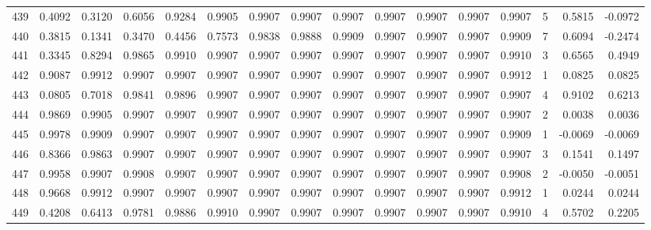 \begin{tabular}{lrrrrrrrrrrrrrrr}
439 &      0.4092 &  0.3120 &  0.6056 &  0.9284 &  0.9905 &  0.9907 &  0.9907 &  0.9907 &  0.9907 &  0.9907 &   0.9907 &     0.9907 &      5 &                    0.5815 &                    -0.0972 \\
440 &      0.3815 &  0.1341 &  0.3470 &  0.4456 &  0.7573 &  0.9838 &  0.9888 &  0.9909 &  0.9907 &  0.9907 &   0.9907 &     0.9909 &      7 &                    0.6094 &                    -0.2474 \\
441 &      0.3345 &  0.8294 &  0.9865 &  0.9910 &  0.9907 &  0.9907 &  0.9907 &  0.9907 &  0.9907 &  0.9907 &   0.9907 &     0.9910 &      3 &                    0.6565 &                     0.4949 \\
442 &      0.9087 &  0.9912 &  0.9907 &  0.9907 &  0.9907 &  0.9907 &  0.9907 &  0.9907 &  0.9907 &  0.9907 &   0.9907 &     0.9912 &      1 &                    0.0825 &                     0.0825 \\
443 &      0.0805 &  0.7018 &  0.9841 &  0.9896 &  0.9907 &  0.9907 &  0.9907 &  0.9907 &  0.9907 &  0.9907 &   0.9907 &     0.9907 &      4 &                    0.9102 &                     0.6213 \\
444 &      0.9869 &  0.9905 &  0.9907 &  0.9907 &  0.9907 &  0.9907 &  0.9907 &  0.9907 &  0.9907 &  0.9907 &   0.9907 &     0.9907 &      2 &                    0.0038 &                     0.0036 \\
445 &      0.9978 &  0.9909 &  0.9907 &  0.9907 &  0.9907 &  0.9907 &  0.9907 &  0.9907 &  0.9907 &  0.9907 &   0.9907 &     0.9909 &      1 &                   -0.0069 &                    -0.0069 \\
446 &      0.8366 &  0.9863 &  0.9907 &  0.9907 &  0.9907 &  0.9907 &  0.9907 &  0.9907 &  0.9907 &  0.9907 &   0.9907 &     0.9907 &      3 &                    0.1541 &                     0.1497 \\
447 &      0.9958 &  0.9907 &  0.9908 &  0.9907 &  0.9907 &  0.9907 &  0.9907 &  0.9907 &  0.9907 &  0.9907 &   0.9907 &     0.9908 &      2 &                   -0.0050 &                    -0.0051 \\
448 &      0.9668 &  0.9912 &  0.9907 &  0.9907 &  0.9907 &  0.9907 &  0.9907 &  0.9907 &  0.9907 &  0.9907 &   0.9907 &     0.9912 &      1 &                    0.0244 &                     0.0244 \\
449 &      0.4208 &  0.6413 &  0.9781 &  0.9886 &  0.9910 &  0.9907 &  0.9907 &  0.9907 &  0.9907 &  0.9907 &   0.9907 &     0.9910 &      4 &                    0.5702 &                     0.2205 \\

\end{tabular}
